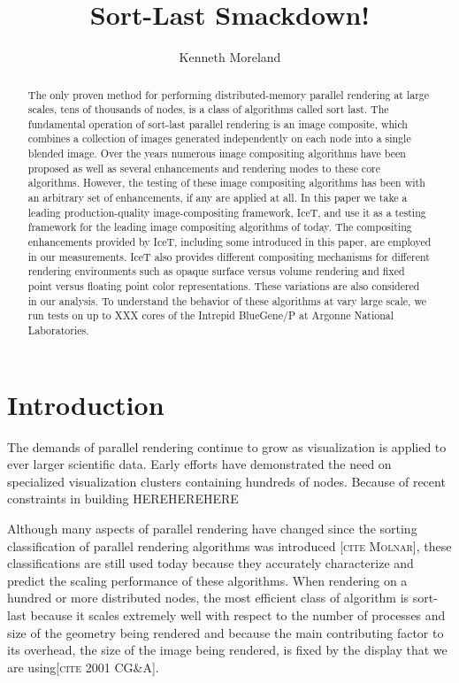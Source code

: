 \documentclass[letterpaper,twocolumn,10pt]{article}
\title{Sort-Last Smackdown!}
\author{Kenneth Moreland}
\newcommand{\sticky}[1]{{\color{red}\textsc{[#1]}}}
\begin{document}
\maketitle

\begin{abstract}
  The only proven method for performing distributed-memory parallel
  rendering at large scales, tens of thousands of nodes, is a class of
  algorithms called sort last.  The fundamental operation of sort-last
  parallel rendering is an image composite, which combines a collection of
  images generated independently on each node into a single blended image.
  Over the years numerous image compositing algorithms have been proposed
  as well as several enhancements and rendering modes to these core
  algorithms.  However, the testing of these image compositing algorithms
  has been with an arbitrary set of enhancements, if any are applied at
  all.  In this paper we take a leading production-quality
  image-compositing framework, IceT, and use it as a testing framework for
  the leading image compositing algorithms of today.  The compositing
  enhancements provided by IceT, including some introduced in this paper,
  are employed in our measurements.  IceT also provides different
  compositing mechanisms for different rendering environments such as
  opaque surface versus volume rendering and fixed point versus floating
  point color representations.  These variations are also considered in our
  analysis.  To understand the behavior of these algorithms at vary large
  scale, we run tests on up to XXX cores of the Intrepid BlueGene/P at
  Argonne National Laboratories.
\end{abstract}

\section{Introduction}
\label{sec:Introduction}

The demands of parallel rendering continue to grow as visualization is
applied to ever larger scientific data.  Early efforts have demonstrated
the need on specialized visualization clusters containing hundreds of
nodes.  Because of recent constraints in building HEREHEREHERE

Although many aspects of parallel rendering have changed since the sorting
classification of parallel rendering algorithms was introduced \sticky{cite
  Molnar}, these classifications are still used today because they
accurately characterize and predict the scaling performance of these
algorithms.  When rendering on a hundred or more distributed nodes, the
most efficient class of algorithm is sort-last because it scales extremely
well with respect to the number of processes and size of the geometry being
rendered and because the main contributing factor to its overhead, the size
of the image being rendered, is fixed by the display that we are
using\sticky{cite 2001 CG\&A}.
\end{document}
